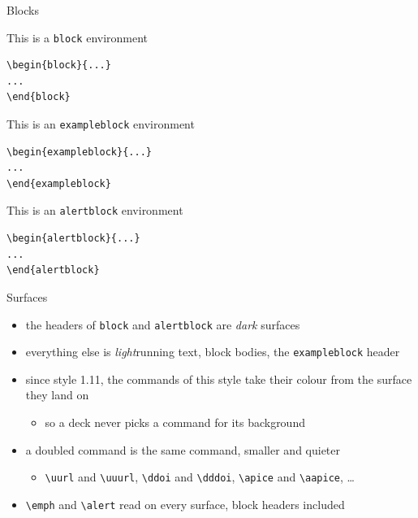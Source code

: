 \documentclass[presentation,cesena,apice]{beamer}\mode<presentation>{\usetheme{AMSBolognaFC}}
\begin{document}
\begin{frame}[c,fragile]{Blocks}
%
\begin{block}{This is a \texttt{block} environment}
\begin{verbatim}
\begin{block}{...}
...
\end{block}
\end{verbatim}
\end{block}
%
\begin{exampleblock}{This is an \texttt{exampleblock} environment}
\begin{verbatim}
\begin{exampleblock}{...}
...
\end{exampleblock}
\end{verbatim}
\end{exampleblock}
%
\begin{alertblock}{This is an \texttt{alertblock} environment}
\begin{verbatim}
\begin{alertblock}{...}
...
\end{alertblock}
\end{verbatim}
\end{alertblock}
%
\end{frame}

\begin{frame}[c]{Surfaces}
%
\begin{itemize}
	\item the headers of \texttt{block} and \texttt{alertblock} are \emph{dark} surfaces
	\item everything else is \emph{light}\textemdash{}running text, block bodies, the \texttt{exampleblock} header
	\item since style 1.11, the commands of this style take their colour from the surface they land on
	\begin{itemize}
		\item so a deck never picks a command for its background
	\end{itemize}
	\item a doubled command is the same command, \alert{smaller and quieter}
	\begin{itemize}
		\item \texttt{\textbackslash{}uurl} and \texttt{\textbackslash{}uuurl}, \texttt{\textbackslash{}ddoi} and \texttt{\textbackslash{}dddoi}, \texttt{\textbackslash{}apice} and \texttt{\textbackslash{}aapice}, \ldots
	\end{itemize}
	\item \texttt{\textbackslash{}emph} and \texttt{\textbackslash{}alert} read on every surface, block headers included
\end{itemize}
%
\end{frame}
\end{document}
